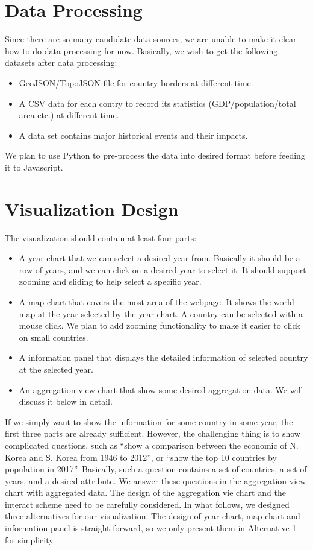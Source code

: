 \documentclass[12pt, fullpage,letterpaper]{article}
\begin{document}
\section{Data Processing}
Since there are so many candidate data sources, we are unable to make it clear how to do data processing for now.
Basically, we wish to get the following datasets after data processing:
\begin{itemize}
    \item GeoJSON/TopoJSON file for country borders at different time.
    \item A CSV data for each contry to record its statistics (GDP/population/total area etc.) at different time.
    \item A data set contains major historical events and their impacts.
\end{itemize}

We plan to use Python to pre-process the data into desired format before feeding it to Javascript.

\section{Visualization Design}

The visualization should contain at least four parts:

\begin{itemize}
    \item A year chart that we can select a desired year from.
        Basically it should be a row of years, and we can click on a desired year to select it.
        It should support zooming and sliding to help select a specific year.
    \item A map chart that covers the most area of the webpage.
        It shows the world map at the year selected by the year chart.
        A country can be selected with a mouse click.
        We plan to add zooming functionality to make it easier to click on small countries.
    \item A information panel that displays the detailed information of selected country at the selected year.
    \item An aggregation view chart that show some desired aggregation data. We will discuss it below in detail.
\end{itemize}

If we simply want to show the information for some country in some year, the
first three parts are already sufficient.  However, the challenging thing is to
show complicated questions, such as ``show a comparison between the economic of
N. Korea and S. Korea from 1946 to 2012'', or ``show the top 10 countries by 
population in 2017''. Basically, such a question contains a set of countries, a
set of years, and a desired attribute.  We answer these questions in the
aggregation view chart with aggregated data. The design of the aggregation
vie chart and the interact scheme need to be carefully considered.
In what follows, we designed three alternatives for our visualization.
The design of year chart, map chart and information panel is straight-forward,
so we only present them in Alternative 1 for simplicity.
\end{document}
